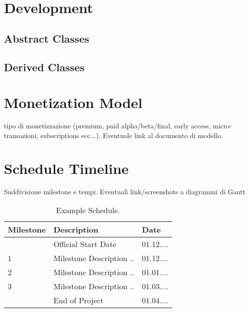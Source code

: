 \documentclass[a4paper]{scrreprt}
\begin{document}

\chapter{Development}

\section{Abstract Classes}

\section{Derived Classes}


\chapter{Monetization Model}
tipo di monetizzazione (premium, paid alpha/beta/final, early access, micro-transazioni, subscriptions ecc...). Eventuale link al documento di modello.


\chapter{Schedule Timeline}
Suddivisione milestone e tempi. Eventuali link/screenshots a diagrammi di Gantt

\begin{table}[h]
\centering
\begin{tabular}{|l|l|l|}
\hline
Milestone & Description & Date \\\hline
& Official Start Date & 01.12.... \\
1 & Milestone Description ..  & 01.12.... \\
2 & Milestone Description ..  & 01.01.... \\
3 & Milestone Description ..  & 01.03.... \\
& End of Project & 01.04.... \\
\hline
\end{tabular}
\caption{\label{tab:schedule}Example Schedule.}
\end{table}
\end{document}

